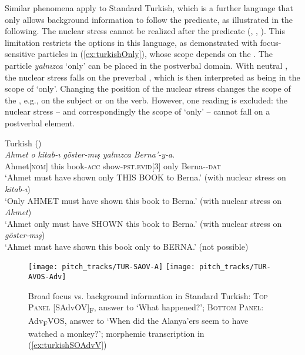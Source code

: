 \documentclass[output=paper,colorlinks,citecolor=brown]{langscibook}
\begin{document}
Similar phenomena apply to Standard Turkish, which is a further language that only allows background information to follow the predicate, as illustrated in the following. The nuclear stress cannot be realized after the predicate (\citealt[51]{taylan_function_1984}, \citealt[103]{goksel_linearity_1998}, \citealt[148--152]{ozge_intonation_2010}{}). This limitation restricts the  options in this language, as demonstrated with focus-sensitive particles in (\ref{ex:turkishOnly}), whose scope depends on the  \citep[24]{kural_properties_1992}. The  particle \textit{yalnızca} `only' can be placed in the postverbal domain. With neutral , the nuclear stress falls on the preverbal , which is then interpreted as being in the scope of `only'. Changing the position of the nuclear stress changes the scope of the , e.g., on the subject or on the verb. However, one reading is excluded: the nuclear stress -- and correspondingly the scope of `only' -- cannot fall on a postverbal element.



\begin{sloppypar}
\ea \label{ex:turkishOnly}
    Turkish (\citealt[24]{kural_properties_1992}) \\
        \gll \textit{Ahmet} \textit{o} \textit{kitab-ı} \textit{göster-mış} \textit{yalnızca} \textit{Berna’-y-a}.\\
        Ahmet[\textsc{nom}] this book-\textsc{acc}	show-\textsc{pst.evid[3]} only Berna-\varnothing-\textsc{dat}\\
        \glt `Ahmet must have shown only THIS BOOK to Berna.’ (with nuclear stress on \textit{kitab-ı})\\
        `Only AHMET must have shown this book to Berna.’ (with nuclear stress on \textit{Ahmet})\\
        `Ahmet only must have SHOWN this book to Berna.’ (with nuclear stress on \textit{göster-mış})\\
        `Ahmet must have shown this book only to BERNA.’ (not possible)\\
    \z

\end{sloppypar}

\begin{figure}[b]
    \texttt{[image: pitch\_tracks/TUR-SAOV-A]}
    \texttt{[image: pitch\_tracks/TUR-AVOS-Adv]}
    \caption{Broad focus vs. background information in Standard Turkish: \textsc{Top Panel} [SAdvOV]\textsubscript{F}, answer to `What happened?'; \textsc{Bottom Panel}: Adv\textsubscript{F}VOS, answer to `When did the Alanya'ers seem to have watched a monkey?'; morphemic transcription in (\ref{ex:turkishSOAdvV})}
    \label{fig:turkishSOAdvV}
\end{figure}
\end{document}
